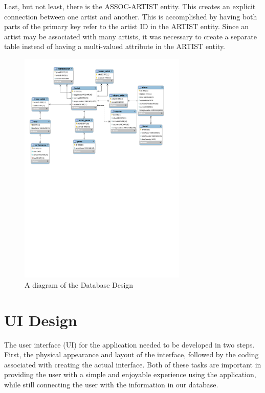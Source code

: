 \documentclass{sig-alternate}
\begin{document}
Last, but not least, there is the ASSOC-ARTIST entity. This creates an explicit connection between one artist 
and another. This is accomplished by having both parts of the primary key refer to the artist ID in the ARTIST 
entity. Since an artist may be associated with many artists, it was necessary to create a separate table instead 
of having a multi-valued attribute in the ARTIST entity.

\begin{figure}[hbtp]
\centering
\includegraphics[width=8cm]{ArtistDB.pdf}
\caption{A diagram of the Database Design}
\label{ArtistDB}
\end{figure}

\section{UI Design}
\label{ui design}

The user interface (UI) for the application needed to be developed in two steps. First, the physical appearance 
and layout of the interface, followed by the coding associated with creating the actual interface. Both of these 
tasks are important in providing the user with a simple and enjoyable experience using the application, while 
still connecting the user with the information in our database. 
\end{document}
